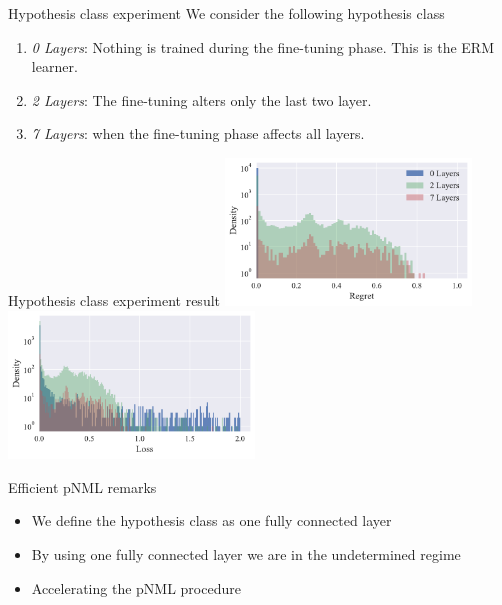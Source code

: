 \documentclass[aspectratio=169]{beamer}
\begin{document}
\begin{frame}{Hypothesis class experiment}
We consider the following hypothesis class
\vspace{0.25cm}
\begin{enumerate}
\setlength\itemsep{1em}
\item \emph{0 Layers}: Nothing is trained during the fine-tuning phase. This is the ERM learner.
\item \emph{2 Layers}: The fine-tuning alters only the last two layer.
\item \emph{7 Layers}: when the fine-tuning phase affects all layers.
\end{enumerate}
\vspace{0.5cm}
\centering

\end{frame}

\begin{frame}{Hypothesis class experiment result}
\includegraphics[width=0.49\textwidth]{figures/dnn_openset_figures/figure_resnet18_regret_histogram_num_layers.pdf}
\includegraphics[width=0.49\textwidth]{figures/dnn_openset_figures/figure_resnet18_loss_histogram_num_layers.pdf}
\end{frame}

\begin{frame}{Efficient pNML remarks}
\vspace{-2.0cm}
\begin{itemize}
\setlength\itemsep{2em}
\item We define the hypothesis class as one fully connected layer
\item By using one fully connected layer we are in the undetermined regime
\item Accelerating the pNML procedure
\end{itemize}
\end{frame}
\end{document}
